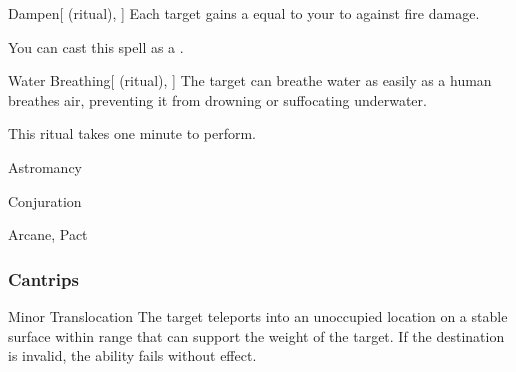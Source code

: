 \lowercase{\hypertarget{spell:Dampen}{}}\label{spell:Dampen}
\begin{attuneability}[\nth{1}]{\hypertarget{spell:Dampen}{Dampen}}[ (ritual), ]
Each target gains a  equal to your  to  against fire damage.

You can cast this spell as a .
\end{attuneability}
\vspace{0.25em}



\lowercase{\hypertarget{spell:Water Breathing}{}}\label{spell:Water Breathing}
\begin{attuneability}[\nth{2}]{\hypertarget{spell:Water Breathing}{Water Breathing}}[ (ritual), ]
The target can breathe water as easily as a human breathes air, preventing it from drowning or suffocating underwater.

This ritual takes one minute to perform.
\end{attuneability}
\vspace{0.25em}


\newpage
\begin{spellsection}{Astromancy}

\begin{spellheader}
\end{spellheader}


 Conjuration

 Arcane, Pact

\subsubsection{Cantrips}


\begin{freeability}{Minor Translocation}
The target teleports into an unoccupied location on a stable surface within range that can support the weight of the target.
If the destination is invalid, the ability fails without effect.
\end{freeability}

\end{spellsection}


